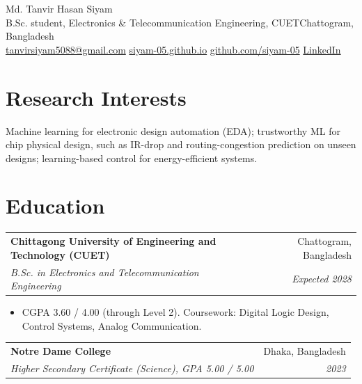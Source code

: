 \documentclass[10pt,letterpaper]{article}
\makeatletter
\newcommand{\entry}[4]{%
  \begin{tabularx}{\textwidth}{@{}X r@{}}
    \textbf{#1} & #2 \\
    \textit{#3} & {\color{muted}\textit{#4}} \\
  \end{tabularx}\vspace{1pt}}
\newcommand{\sep}{\enspace{\color{muted}$\cdot$}\enspace}
\makeatother
\begin{document}
\begin{center}
  {\fontsize{22}{26}\selectfont Md. Tanvir Hasan Siyam}\\[5pt]
  {\color{muted}B.Sc. student, Electronics \& Telecommunication Engineering, CUET\sep Chattogram, Bangladesh}\\[3pt]
  \href{mailto:tanvirsiyam5088@gmail.com}{tanvirsiyam5088@gmail.com}\sep
  \href{https://siyam-05.github.io}{siyam-05.github.io}\sep
  \href{https://github.com/siyam-05}{github.com/siyam-05}\sep
  \href{https://www.linkedin.com/in/md-tanvir-hasan-siyam-b59a02343}{LinkedIn}
\end{center}
\vspace{-4pt}

\section{Research Interests}
Machine learning for electronic design automation (EDA); trustworthy ML for chip physical design, such as
IR-drop and routing-congestion prediction on unseen designs; learning-based control for energy-efficient systems.

\section{Education}
\entry{Chittagong University of Engineering and Technology (CUET)}{Chattogram, Bangladesh}
      {B.Sc. in Electronics and Telecommunication Engineering}{Expected 2028}
\vspace{-1pt}
\begin{itemize}
  \item CGPA 3.60 / 4.00 (through Level 2). Coursework: Digital Logic Design, Control Systems, Analog Communication.
\end{itemize}
\vspace{2pt}
\entry{Notre Dame College}{Dhaka, Bangladesh}
      {Higher Secondary Certificate (Science), GPA 5.00 / 5.00}{2023}

\end{document}
